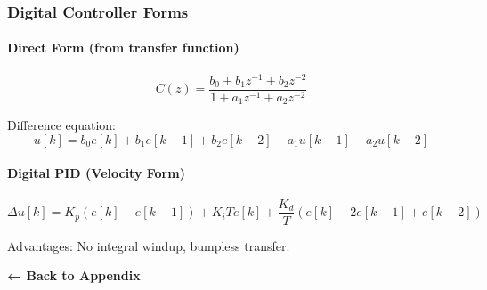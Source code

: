\documentclass[11pt,a4paper]{book}
\begin{document}
\medskip\noindent\hrulefill\medskip

\subsubsection{Digital Controller Forms}

\paragraph{Direct Form (from transfer function)}

\[C(z) = \frac{b_0 + b_1 z^{-1} + b_2 z^{-2}}{1 + a_1 z^{-1} + a_2 z^{-2}}\]

Difference equation:
\[u[k] = b_0 e[k] + b_1 e[k-1] + b_2 e[k-2] - a_1 u[k-1] - a_2 u[k-2]\]

\paragraph{Digital PID (Velocity Form)}

\[\Delta u[k] = K_p (e[k] - e[k-1]) + K_i T e[k] + \frac{K_d}{T}(e[k] - 2e[k-1] + e[k-2])\]

Advantages: No integral windup, bumpless transfer.

\medskip\noindent\hrulefill\medskip

\textbf{← Back to Appendix}
\end{document}
